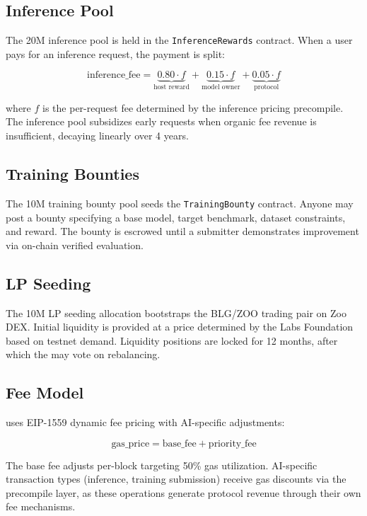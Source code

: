 \subsection{Inference Pool}

The 20M \BLG{} inference pool is held in the \texttt{InferenceRewards} contract. When a user pays \BLG{} for an inference request, the payment is split:

\begin{equation}
\text{inference\_fee} = \underbrace{0.80 \cdot f}_{\text{host reward}} + \underbrace{0.15 \cdot f}_{\text{model owner}} + \underbrace{0.05 \cdot f}_{\text{protocol}}
\end{equation}

where $f$ is the per-request fee determined by the inference pricing precompile. The inference pool subsidizes early requests when organic fee revenue is insufficient, decaying linearly over 4 years.

\subsection{Training Bounties}

The 10M \BLG{} training bounty pool seeds the \texttt{TrainingBounty} contract. Anyone may post a bounty specifying a base model, target benchmark, dataset constraints, and \BLG{} reward. The bounty is escrowed until a submitter demonstrates improvement via on-chain verified evaluation.

\subsection{LP Seeding}

The 10M \BLG{} LP seeding allocation bootstraps the BLG/ZOO trading pair on Zoo DEX. Initial liquidity is provided at a price determined by the \Zoo{} Labs Foundation based on testnet demand. Liquidity positions are locked for 12 months, after which the \DAO{} may vote on rebalancing.

\subsection{Fee Model}

\Beluga{} uses EIP-1559 dynamic fee pricing with AI-specific adjustments:

\begin{equation}
\text{gas\_price} = \text{base\_fee} + \text{priority\_fee}
\end{equation}

The base fee adjusts per-block targeting 50\% gas utilization. AI-specific transaction types (inference, training submission) receive gas discounts via the precompile layer, as these operations generate protocol revenue through their own fee mechanisms.


